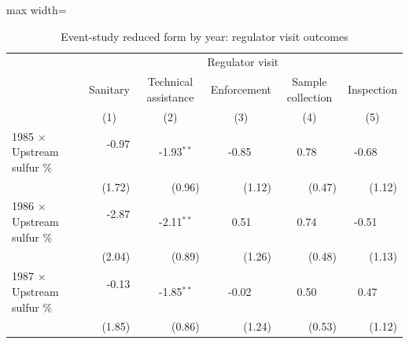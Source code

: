 \begin{table}[htbp]
\raggedright
\begin{minipage}{\linewidth}
\caption{\label{tab:es_rf_coefs_h2_k2} Event-study reduced form by year: regulator visit outcomes}
\end{minipage}
\small
{\setlength{\tabcolsep}{4pt}%
\begin{adjustbox}{max width=\linewidth}
\begin{tabular}{lrrrrr}
\toprule
 & \multicolumn{5}{c}{Regulator visit} \\
 & \multicolumn{1}{c}{Sanitary} & \multicolumn{1}{c}{Technical assistance} & \multicolumn{1}{c}{Enforcement} & \multicolumn{1}{c}{Sample collection} & \multicolumn{1}{c}{Inspection} \\
 & \multicolumn{1}{c}{(1)} & \multicolumn{1}{c}{(2)} & \multicolumn{1}{c}{(3)} & \multicolumn{1}{c}{(4)} & \multicolumn{1}{c}{(5)} \\
\hline
1985 $\times$ Upstream sulfur \% & \phantom{(}-0.97$^{\phantom{*}\phantom{*}\phantom{*}}$ & \phantom{(}-1.93$^{**\phantom{*}}$ & \phantom{(}-0.85$^{\phantom{*}\phantom{*}\phantom{*}}$ & \phantom{(}\phantom{-}0.78$^{\phantom{*}\phantom{*}\phantom{*}}$ & \phantom{(}-0.68$^{\phantom{*}\phantom{*}\phantom{*}}$ \\
 & (\phantom{-}1.72)\phantom{$^{***}$} & (\phantom{-}0.96)\phantom{$^{***}$} & (\phantom{-}1.12)\phantom{$^{***}$} & (\phantom{-}0.47)\phantom{$^{***}$} & (\phantom{-}1.12)\phantom{$^{***}$} \\
1986 $\times$ Upstream sulfur \% & \phantom{(}-2.87$^{\phantom{*}\phantom{*}\phantom{*}}$ & \phantom{(}-2.11$^{**\phantom{*}}$ & \phantom{(}\phantom{-}0.51$^{\phantom{*}\phantom{*}\phantom{*}}$ & \phantom{(}\phantom{-}0.74$^{\phantom{*}\phantom{*}\phantom{*}}$ & \phantom{(}-0.51$^{\phantom{*}\phantom{*}\phantom{*}}$ \\
 & (\phantom{-}2.04)\phantom{$^{***}$} & (\phantom{-}0.89)\phantom{$^{***}$} & (\phantom{-}1.26)\phantom{$^{***}$} & (\phantom{-}0.48)\phantom{$^{***}$} & (\phantom{-}1.13)\phantom{$^{***}$} \\
1987 $\times$ Upstream sulfur \% & \phantom{(}-0.13$^{\phantom{*}\phantom{*}\phantom{*}}$ & \phantom{(}-1.85$^{**\phantom{*}}$ & \phantom{(}-0.02$^{\phantom{*}\phantom{*}\phantom{*}}$ & \phantom{(}\phantom{-}0.50$^{\phantom{*}\phantom{*}\phantom{*}}$ & \phantom{(}\phantom{-}0.47$^{\phantom{*}\phantom{*}\phantom{*}}$ \\
 & (\phantom{-}1.85)\phantom{$^{***}$} & (\phantom{-}0.86)\phantom{$^{***}$} & (\phantom{-}1.24)\phantom{$^{***}$} & (\phantom{-}0.53)\phantom{$^{***}$} & (\phantom{-}1.12)\phantom{$^{***}$} \\

\end{tabular}
\end{adjustbox}}
\end{table}
